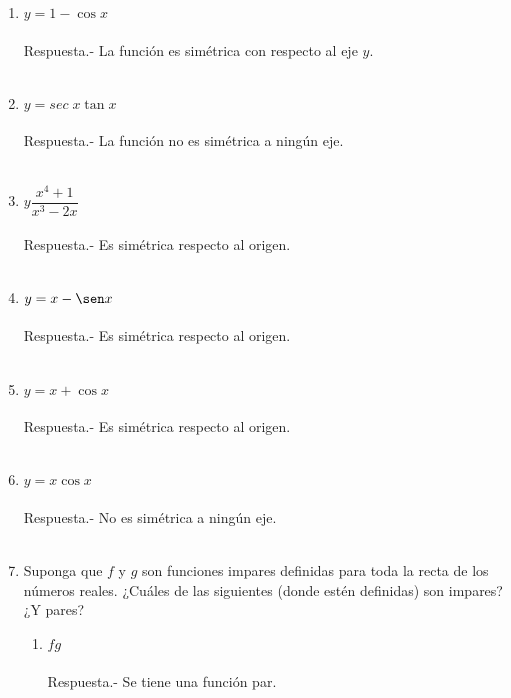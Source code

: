 \begin{enumerate}[\bfseries 1.]
\item $y=1- \cos x$\\\\
    Respuesta.-\; La función es simétrica con respecto al eje $y$.\\\\

\item $y=sec \; x \tan x$\\\\
    Respuesta.-\; La función no es simétrica a ningún eje.\\\\

\item $y\dfrac{x^4 + 1}{x^3 - 2x}$\\\\
    Respuesta.-\; Es simétrica respecto al origen.\\\\ 

\item $y =  x - \sen x$\\\\
    Respuesta.-\; Es simétrica respecto al origen.\\\\

\item $y = x + \cos x$\\\\
    Respuesta.-\; Es simétrica respecto al origen.\\\\

\item $y=x \cos x$\\\\
    Respuesta.-\; No es simétrica a ningún eje.\\\\

\item Suponga que $f$ y $g$ son funciones impares definidas para toda la recta de los números reales. ¿Cuáles de las siguientes (donde estén definidas) son impares? ¿Y pares?
\begin{enumerate}[\bfseries a)]

    \item $fg$\\\\
	Respuesta.-\; Se tiene una función par.\\\\


\end{enumerate}
\end{enumerate}
